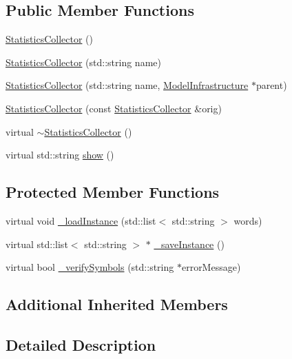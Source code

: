 \subsection*{Public Member Functions}
\begin{DoxyCompactItemize}
\item 
\hyperlink{class_statistics_collector_a2129c2bd19f9d64814fbfe18974a6d2e}{Statistics\-Collector} ()
\item 
\hyperlink{class_statistics_collector_acbb20e7e94252ff7105de7b0cdecb7ee}{Statistics\-Collector} (std\-::string name)
\item 
\hyperlink{class_statistics_collector_a9c51fc17337d3c050ff7e650825cccf9}{Statistics\-Collector} (std\-::string name, \hyperlink{class_model_infrastructure}{Model\-Infrastructure} $\ast$parent)
\item 
\hyperlink{class_statistics_collector_a25e8def6d91decdf48d7c0fedb4382dc}{Statistics\-Collector} (const \hyperlink{class_statistics_collector}{Statistics\-Collector} \&orig)
\item 
virtual \hyperlink{class_statistics_collector_aef9244a0c9f715bc19136d283b759c6e}{$\sim$\-Statistics\-Collector} ()
\item 
virtual std\-::string \hyperlink{class_statistics_collector_a7ce8dad7e29d06c73a01d2ddee93fe00}{show} ()
\end{DoxyCompactItemize}
\subsection*{Protected Member Functions}
\begin{DoxyCompactItemize}
\item 
virtual void \hyperlink{class_statistics_collector_aa13d2bc6d9deeffa9667388ae3e4f962}{\-\_\-load\-Instance} (std\-::list$<$ std\-::string $>$ words)
\item 
virtual std\-::list$<$ std\-::string $>$ $\ast$ \hyperlink{class_statistics_collector_a66eed8e1bd0316588575aa7310ac028b}{\-\_\-save\-Instance} ()
\item 
virtual bool \hyperlink{class_statistics_collector_a5aeefa5028a2b6a0157db55c0dfc7419}{\-\_\-verify\-Symbols} (std\-::string $\ast$error\-Message)
\end{DoxyCompactItemize}
\subsection*{Additional Inherited Members}


\subsection{Detailed Description}


